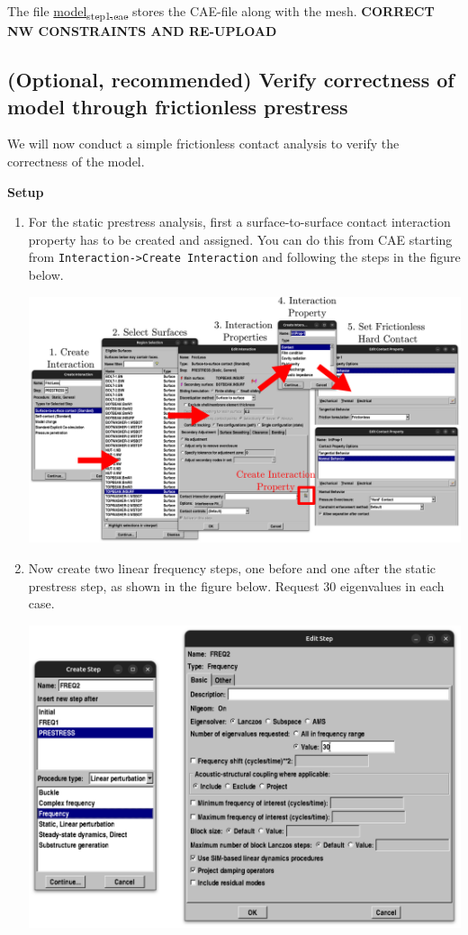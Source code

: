 \documentclass[11pt]{article}
\begin{document}
The file \href{https://github.com/Nidish96/Abaqus4Joints/blob/main/assets/assembly/model\_step1.cae}{model\textsubscript{step1.cae}} stores the CAE-file along with the mesh.
\textbf{CORRECT NW CONSTRAINTS AND RE-UPLOAD}
\subsection{(Optional, recommended) Verify correctness of model through frictionless prestress}
\label{sec:orgc9442ed}
We will now conduct a simple frictionless contact analysis to verify the correctness of the model.

\textbf{Setup}
\begin{enumerate}
\item For the static prestress analysis, first a surface-to-surface contact interaction property has to be created and assigned.
You can do this from CAE starting from \texttt{Interaction->Create Interaction} and following the steps in the figure below.
\begin{center}
\includegraphics[width=.9\linewidth]{./figs/setcontact.png}
\end{center}
\item Now create two linear frequency steps, one before and one after the static prestress step, as shown in the figure below.
Request 30 eigenvalues in each case.
\begin{center}
\includegraphics[width=.9\linewidth]{./figs/lfreq.png}

\end{center}
\end{enumerate}
\end{document}

